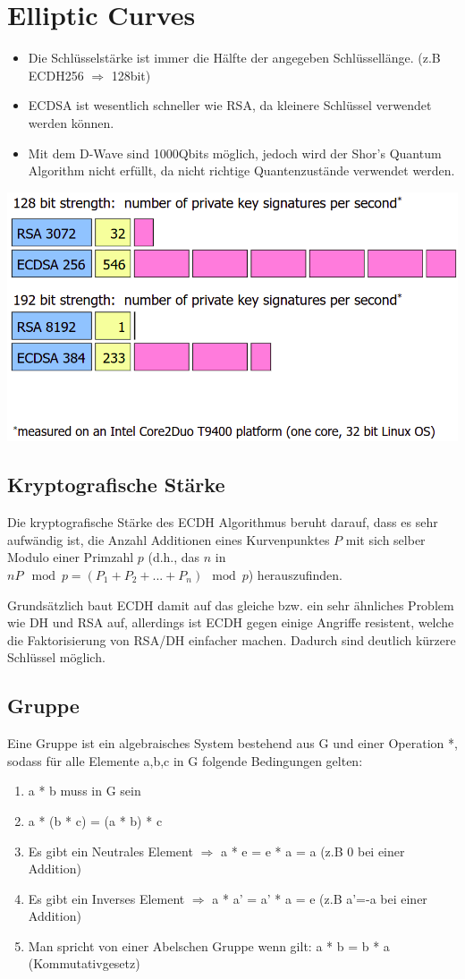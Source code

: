 \section{Elliptic Curves}
\begin{itemize}
	\item Die Schlüsselstärke ist immer die Hälfte der angegeben Schlüssellänge. (z.B ECDH256 $\Rightarrow$ 128bit)
	\item ECDSA ist wesentlich schneller wie RSA, da kleinere Schlüssel verwendet werden können.
	\item Mit dem D-Wave sind 1000Qbits möglich, jedoch wird der Shor's Quantum Algorithm nicht erfüllt, da nicht richtige Quantenzustände verwendet werden.
\end{itemize}
\begin{minipage}[t]{1\textwidth}
\centering
	\includegraphics[width=0.6\linewidth]{images/rsa-vs-ecdsa.png}
\end{minipage}

\subsection{Kryptografische Stärke}
Die kryptografische Stärke des ECDH Algorithmus beruht darauf, dass es sehr aufwändig ist, die Anzahl Additionen eines Kurvenpunktes $P$ mit sich selber Modulo einer Primzahl $p$ (d.h., das $n$ in $nP \mod p = (P_1 + P_2 + ... + P_n) \mod p$) herauszufinden.

Grundsätzlich baut ECDH damit auf das gleiche bzw. ein sehr ähnliches Problem wie DH und RSA auf, allerdings ist ECDH gegen einige Angriffe resistent, welche die Faktorisierung von RSA/DH einfacher machen. Dadurch sind deutlich kürzere Schlüssel möglich.

\subsection{Gruppe}\label{sec:gruppe}
Eine Gruppe ist ein algebraisches System bestehend aus G und einer Operation *, sodass für alle Elemente a,b,c in G folgende Bedingungen gelten:
\begin{enumerate}
	\item a * b muss in G sein
	\item a * (b * c) = (a * b) * c
	\item Es gibt ein Neutrales Element $\Rightarrow$ a * e = e * a = a (z.B 0 bei einer Addition)
	\item Es gibt ein Inverses Element $\Rightarrow$ a * a' = a' * a = e (z.B a'=-a bei einer Addition)
	\item Man spricht von einer Abelschen Gruppe wenn gilt: a * b = b * a (Kommutativgesetz)
\end{enumerate}

